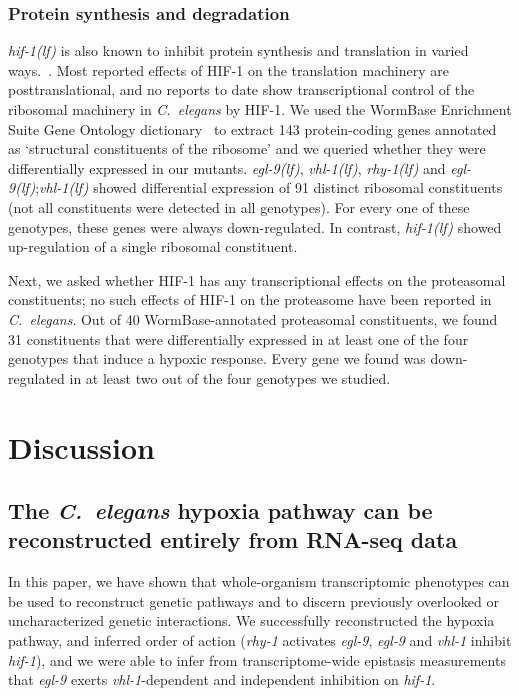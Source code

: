\documentclass[10pt, onecolumn]{article}
\newcommand{\cel}{\emph{C.~elegans}}
\newcommand{\gene}[1]{\emph{#1}}
\newcommand{\egl}{\emph{\mbox{egl-9}(lf)}}
\newcommand{\rhy}{\emph{\mbox{rhy-1}(lf)}}
\newcommand{\vhl}{\emph{\mbox{vhl-1}(lf)}}
\newcommand{\hif}{\emph{\mbox{hif-1(lf)}}}
\newcommand{\hifp}{HIF-1}
\begin{document}
\subsubsection*{Protein synthesis and degradation}
\hif{} is also known to inhibit protein synthesis and translation in varied
ways.~\cite{Brugarolas2004}. Most reported effects of
\hifp{} on the translation machinery are posttranslational, and no reports to date
show transcriptional control of the ribosomal machinery in \cel{} by \hifp{}. We
used the WormBase Enrichment Suite Gene Ontology
dictionary~\cite{Angeles-Albores2016b} to extract 143 protein-coding genes
annotated as `structural constituents of the ribosome' and we queried whether
they were differentially expressed in our mutants. \egl{}, \vhl{}, \rhy{} and
\egl{};\vhl{} showed differential expression of 91 distinct ribosomal constituents
(not all constituents were detected in all genotypes). For every one of these
genotypes, these genes were always down-regulated. In contrast, \hif{} showed
up-regulation of a single ribosomal constituent.

Next, we asked whether \hifp{} has any transcriptional effects on the
proteasomal constituents; no such effects of \hifp{} on the proteasome
have been reported in \cel{}. Out of 40 WormBase-annotated proteasomal constituents,
we found 31 constituents that were differentially expressed in at least one of the
four genotypes that induce a hypoxic response. Every gene we found was down-regulated
in at least two out of the four genotypes we studied.

\section*{Discussion}
\subsection*{The \cel{} hypoxia pathway can be reconstructed entirely from
             RNA-seq data}
In this paper, we have shown that whole-organism transcriptomic phenotypes
can be used to reconstruct genetic pathways and to discern previously overlooked
or uncharacterized genetic interactions. We successfully reconstructed the hypoxia
pathway, and inferred order of action (\gene{rhy-1} activates \gene{egl-9},
\gene{egl-9} and \gene{vhl-1} inhibit \gene{hif-1}), and we were able to infer
from transcriptome-wide epistasis measurements that \gene{egl-9} exerts
\gene{vhl-1}-dependent and independent inhibition on \gene{hif-1}.
\end{document}
